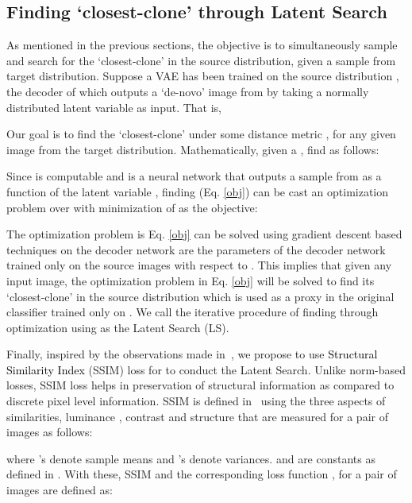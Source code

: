 \documentclass[journal,twoside,web]{IEEEtran}
\newcommand{\cc}{\textcolor{black}}
\begin{document}
\setlength{\textfloatsep}{0pt}
\subsection{Finding `closest-clone' through Latent Search}
As mentioned in the previous sections, the objective is to simultaneously sample and search for the `closest-clone' in the source distribution, given a sample from target distribution.  Suppose a VAE has been trained on the source distribution , the decoder  of which outputs a `de-novo' image from  by taking a normally distributed latent variable as input. That is, 
\setlength{\textfloatsep}{0pt}


Our goal is to find the `closest-clone' under some distance metric , for any given image from the target distribution. Mathematically, given a , find  as follows:



Since  is computable and  is a neural network that outputs a sample from  as a function of the latent variable , finding  (Eq. \ref{obj}) can be cast an optimization problem over  with minimization of  as the objective:


The optimization problem is Eq. \ref{obj} can be solved using gradient descent based techniques on the decoder network   are the parameters of the decoder network trained only on the source images   with respect to . This implies that given any input image, the optimization problem in Eq. \ref{obj} will be solved to find its `closest-clone' in the source distribution which is used as a proxy in the original classifier trained only on . We call the iterative procedure of finding   through optimization using  as the Latent Search (LS).

Finally, inspired by the observations made  in~\cite{zhao2016loss,mishra2018ultrasound}, we propose
to use \cc{Structural Similarity Index} (SSIM) loss for  to conduct the Latent Search. Unlike norm-based losses, SSIM loss helps in preservation of structural information as compared to discrete pixel level information. SSIM  is defined in~\cite{wang2004image} using the three aspects of similarities, luminance , contrast  and structure  that are measured for a pair of images  as follows:\setlength{\textfloatsep}{0pt}

\setlength{\textfloatsep}{0pt}

\setlength{\textfloatsep}{0pt}

where 's denote sample means and 's denote variances.  and  are constants as defined in \cite{wang2004image}. With these, SSIM and the corresponding loss function , for a pair of images  are defined as: 
\setlength{\textfloatsep}{0pt}
\end{document}
